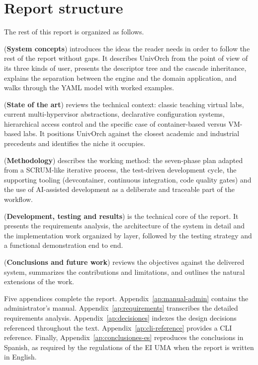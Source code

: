 \section{Report structure}
\label{sec:estructura}

The rest of this report is organized as follows.

 (\textbf{System concepts}) introduces the
ideas the reader needs in order to follow the rest of the report
without gaps. It describes UnivOrch from the point of view of
its three kinds of user, presents the descriptor tree and the
cascade inheritance, explains the separation between the engine
and the domain application, and walks through the YAML model
with worked examples.

 (\textbf{State of the art}) reviews the
technical context: classic teaching virtual labs, current
multi-hypervisor abstractions, declarative configuration systems,
hierarchical access control and the specific case of container-based
versus VM-based labs. It positions UnivOrch against the closest
academic and industrial precedents and identifies the niche it
occupies.

 (\textbf{Methodology}) describes the working
method: the seven-phase plan adapted from a SCRUM-like iterative
process, the test-driven development cycle, the supporting tooling
(devcontainer, continuous integration, code quality gates) and the
use of AI-assisted development as a deliberate and traceable part of
the workflow.

 (\textbf{Development, testing and results}) is
the technical core of the report. It presents the requirements
analysis, the architecture of the system in detail and the
implementation work organized by layer, followed by the testing
strategy and a functional demonstration end to end.

 (\textbf{Conclusions and future work}) reviews
the objectives against the delivered system, summarizes the
contributions and limitations, and outlines the natural extensions of
the work.

Five appendices complete the report. Appendix~\ref{ap:manual-admin}
contains the administrator's manual. Appendix~\ref{ap:requirements}
transcribes the detailed requirements analysis.
Appendix~\ref{ap:decisiones} indexes the design decisions referenced
throughout the text. Appendix~\ref{ap:cli-reference} provides a CLI reference.
Finally, Appendix~\ref{ap:conclusiones-es} reproduces the conclusions
in Spanish, as required by the regulations of the EI UMA when the
report is written in English.
